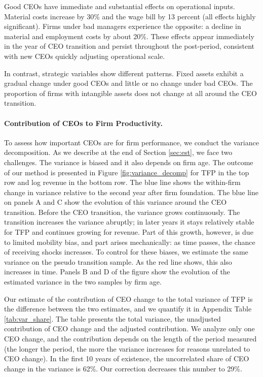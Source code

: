 \documentclass[11pt,a4paper]{article}
\begin{document}
Good CEOs have immediate and substantial effects on operational inputs. Material costs increase by 30\% and the wage bill by 13 percent (all effects highly significant). Firms under bad managers experience the opposite: a decline in material and employment costs by about 20\%. These effects appear immediately in the year of CEO transition and persist throughout the post-period, consistent with new CEOs quickly adjusting operational scale.

In contrast, strategic variables show different patterns. Fixed assets exhibit a gradual change under good CEOs and little or no change under bad CEOs. The proportion of firms with intangible assets does not change at all around the CEO transition.

\paragraph{Contribution of CEOs to Firm Productivity.} To assess how important CEOs are for firm performance, we conduct the variance decomposition. As we describe at the end of Section \ref{sec:est}, we face two challenges. The variance is biased and it also depends on firm age. The outcome of our method is presented in Figure \ref{fig:variance_decomp} for TFP in the top row and log revenue in the bottom row. The blue line shows the within-firm change in variance relative to the second year after firm foundation. The blue line on panels A and C show the evolution of this variance around the CEO transition. Before the CEO transition, the variance grows continuously. The transition increases the variance abruptly; in later years it stays relatively stable for TFP and continues growing for revenue. Part of this growth, however, is due to limited mobility bias, and part arises mechanically: as time passes, the chance of receiving shocks increases. To control for these biases, we estimate the same variance on the pseudo transition sample. As the red line shows, this also increases in time. Panels B and D of the figure show the evolution of the estimated variance in the two samples by firm age. 

Our estimate of the contribution of CEO change to the total variance of TFP is the difference between the two estimates, and we quantify it in Appendix Table \ref{tab:var_share}. The table presents the total variance, the unadjusted contribution of CEO change and the adjusted contribution. We analyze only one CEO change, and the contribution depends on the length of the period measured (the longer the period, the more the variance increases for reasons unrelated to CEO change). In the first 10 years of existence, the uncorrelated share of CEO change in the variance is 62\%. Our correction decreases this number to 29\%.
\end{document}
